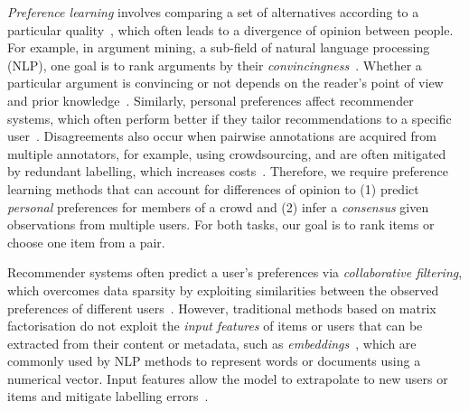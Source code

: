 \emph{Preference learning} 
involves comparing a set of alternatives
according to a particular quality~\citep{furnkranz2010preference},
which often leads to a divergence of opinion between people.
For example, in argument mining, 
a sub-field of natural language processing (NLP),
one goal is to rank arguments by their \emph{convincingness}~\citep{habernal2016argument}. 
Whether a particular argument is convincing or not depends on the reader's point of view and prior knowledge~\citep{lukin2017argument}.
Similarly, personal preferences affect recommender systems,
which often perform better if they tailor recommendations
to a specific user~\citep{resnick1997recommender}.
Disagreements also occur when pairwise annotations are acquired from multiple annotators,
for example, using crowdsourcing,
and are often mitigated by redundant labelling, 
which increases costs~\citep{snow2008cheap,banerji2010galaxy}.
Therefore, we require preference learning methods that can account for differences of opinion to
(1) predict \emph{personal} preferences for members of a crowd
and
(2) infer a \emph{consensus} given observations from multiple users.
For both tasks, our goal is to rank items or choose one item from a pair.

Recommender systems often %
predict a user's preferences via \emph{collaborative filtering},  
which overcomes data sparsity by exploiting similarities between the observed preferences of different users~\citep{resnick1997recommender,koren2009matrix}.
However, traditional methods based on matrix factorisation 
do not exploit the \emph{input features} of items or users
that can be extracted from their content or metadata,
such as \emph{embeddings}~\citep{mikolov2013distributed,devlin2018bert},
which are commonly used by NLP methods to represent words or documents using a numerical vector.
Input features allow the model to extrapolate to new users or items %
and mitigate labelling errors~\citep{felt2016semantic}. %

